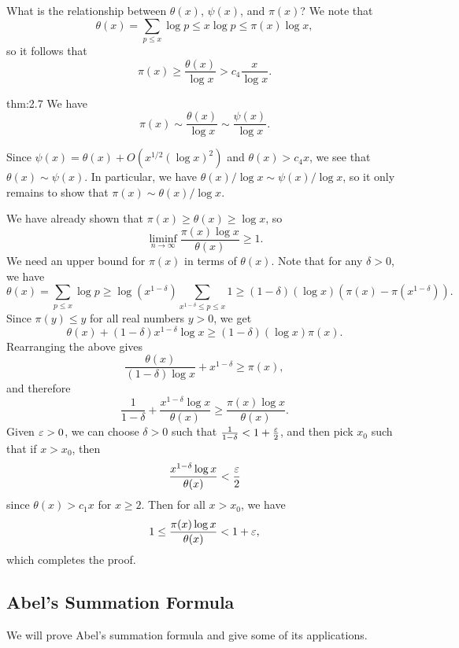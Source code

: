 What is the relationship between $\theta(x)$, $\psi(x)$, and $\pi(x)$? We note that 
\[ \theta(x) = \sum_{p \leq x} \log p \leq x \log p \leq \pi(x) \log x, \]
so it follows that 
\[ \pi(x) \geq \frac{\theta(x)}{\log x} > c_4 \frac{x}{\log x}. \]

\begin{theo}{thm:2.7}
We have 
\[ \pi(x) \sim \frac{\theta(x)}{\log x} \sim \frac{\psi(x)}{\log x}. \]
\end{theo}
\begin{pf}
Since $\psi(x) = \theta(x) + O(x^{1/2} (\log x)^2)$ and $\theta(x) > c_4x$, we see that $\theta(x) 
\sim \psi(x)$. In particular, we have $\theta(x)/\log x \sim \psi(x)/\log x$, so it only 
remains to show that $\pi(x) \sim \theta(x)/\log x$. 

We have already shown that $\pi(x) \geq \theta(x) \geq \log x$, so 
\[ \liminf_{n\to\infty} \frac{\pi(x) \log x}{\theta(x)} \geq 1. \]
We need an upper bound for $\pi(x)$ in terms of $\theta(x)$. Note that for any $\delta > 0$, we have 
\[ \theta(x) = \sum_{p\leq x} \log p \geq \log(x^{1-\delta}) \sum_{x^{1-\delta} \leq p \leq x} 1 
\geq (1-\delta)(\log x)\left(\pi(x) - \pi(x^{1-\delta})\right). \]
Since $\pi(y) \leq y$ for all real numbers $y > 0$, we get 
\[ \theta(x) + (1-\delta)x^{1-\delta} \log x \geq (1-\delta)(\log x)\pi(x). \]
Rearranging the above gives 
\[ \frac{\theta(x)}{(1-\delta)\log x} + x^{1-\delta} \geq \pi(x), \]
and therefore 
\[ \frac{1}{1-\delta} + \frac{x^{1-\delta}\log x}{\theta(x)} \geq \frac{\pi(x)\log x}{\theta(x)}. \]
Given $\varepsilon > 0$, we can choose $\delta > 0$ such that $\frac{1}{1-\delta} < 1 + \frac{\varepsilon}2$, 
and then pick $x_0$ such that if $x > x_0$, then 
\[ \frac{x^{1-\delta}\log x}{\theta(x)} < \frac{\varepsilon}2 \] 
since $\theta(x) > c_1x$ for $x \geq 2$. Then for all $x > x_0$, we have 
\[ 1 \leq \frac{\pi(x) \log x}{\theta(x)} < 1 + \varepsilon, \]
which completes the proof.
\end{pf}

\subsection{Abel's Summation Formula}\label{subsec:2.3}
We will prove Abel's summation formula and give some of its
applications.

